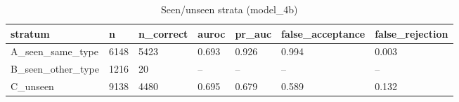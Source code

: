 \begin{table}[t]
\centering
\small
\begin{tabular}{lllllll}
\hline
stratum & n & n\_correct & auroc & pr\_auc & false\_acceptance & false\_rejection \\
\hline
A\_seen\_same\_type & 6148 & 5423 & 0.693 & 0.926 & 0.994 & 0.003 \\
B\_seen\_other\_type & 1216 & 20 & -- & -- & -- & -- \\
C\_unseen & 9138 & 4480 & 0.695 & 0.679 & 0.589 & 0.132 \\
\hline
\end{tabular}
\caption{Seen/unseen strata (model\_4b)}
\label{tab:strata_model_4b}
\end{table}
